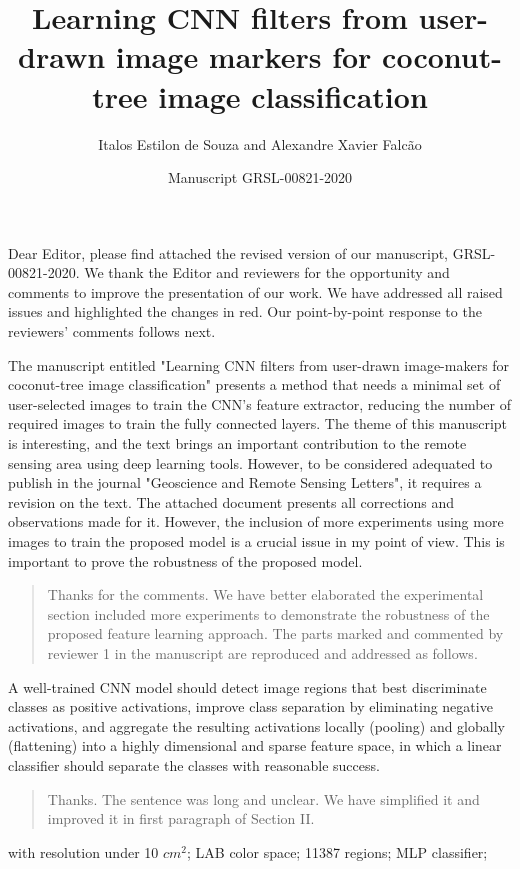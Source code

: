 \documentclass[a4paper,12pt]{article}
\title{Learning CNN filters from user-drawn image markers for coconut-tree image classification}
\author{Italos Estilon de Souza and Alexandre Xavier Falc\~{a}o}
\date{Manuscript GRSL-00821-2020}
\newcommand{\rwr}[1]{\par \medskip \noindent {\bf Reviewer #1: }}
\newcommand{\ans}{\smallskip\begin{quote}  \noindent }
\newcommand{\eans}{\end{quote}}
\begin{document}
\maketitle

Dear Editor, please find attached the revised version of our manuscript, GRSL-00821-2020. We thank the Editor and
reviewers for the opportunity and comments to improve the presentation of our work. We have addressed all raised issues and highlighted the changes in red. Our point-by-point response to the reviewers' comments follows next. 

\rwr{1} 
The manuscript entitled "Learning CNN ﬁlters from user-drawn image-makers for coconut-tree image classiﬁcation" presents a method that needs a minimal set of user-selected images to train the CNN’s feature extractor, reducing the number of required images to train the fully connected layers. The theme of this manuscript is interesting, and the text brings an important contribution to the remote sensing area using deep learning tools. However, to be considered adequated to publish in the journal "Geoscience and Remote Sensing Letters", it requires a revision on the text. The attached document presents all corrections and observations made for it. However, the inclusion of more experiments using more images to train the proposed model is a crucial issue in my point of view. This is important to prove the robustness of the proposed model.

\ans 

Thanks for the comments. We have better elaborated the experimental section included more experiments to demonstrate the robustness of the proposed feature learning approach. The parts marked and commented by reviewer 1 in the manuscript are reproduced and addressed as follows.

\eans


\rwr{1} A well-trained CNN model should detect image regions that best discriminate classes as positive activations, improve class separation by eliminating negative activations, and aggregate the resulting activations locally (pooling) and globally (flattening) into a highly dimensional and sparse feature space, in which a linear classifier should separate the classes with reasonable success.

\ans  Thanks. The sentence was long and unclear. We have simplified it and improved it in first paragraph of Section II.
\eans

\rwr{1} with resolution under 10 $cm^2$; LAB color space; 11387 regions; MLP classifier; 
\end{document}
